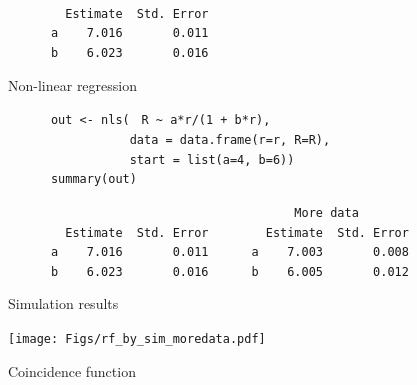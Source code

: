 \documentclass[12pt]{article}
\newcommand{\headsize}{\fontsize{35}{35} \selectfont}
\newcommand{\textsize}{\fontsize{30}{35} \selectfont}
\begin{document}
\color{mywhite}
\verb|                            | \\
\verb|        Estimate  Std. Error| \\
\verb|      a    7.016       0.011| \\
\verb|      b    6.023       0.016|

\newpage


\addtocounter{page}{-1}

\headsize \color{myyellow}
\hfill \begin{minipage}{5.75in}
\centering
Non-linear regression
\end{minipage}


\vspace{30mm}

\textsize 
{\color{myblue}
\verb|      out <- nls(| {\tt \color{mypink} R \verb|~| a*r/(1 + b*r)}\verb|,| \\
\verb|                 data = data.frame(r=r, R=R),| \\
\verb|                 start = list(a=4, b=6))| \\
\verb|      summary(out)|
}

\vspace{15mm}

\color{mypink}
\verb|                                        More data       | \\
\color{mywhite}
\verb|        Estimate  Std. Error        Estimate  Std. Error| \\
\verb|      a    7.016       0.011      a    7.003       0.008| \\
\verb|      b    6.023       0.016      b    6.005       0.012|


\newpage

\headsize \color{myyellow}
\hfill \begin{minipage}{5.75in}
\centering
Simulation results
\end{minipage}

\vfill

\centerline{\texttt{[image: Figs/rf\_by\_sim\_moredata.pdf]}}

\vspace{15mm}

\newpage

\headsize \color{myyellow}
\hfill \begin{minipage}{5.75in}
\centering
Coincidence function
\end{minipage}
\end{document}
